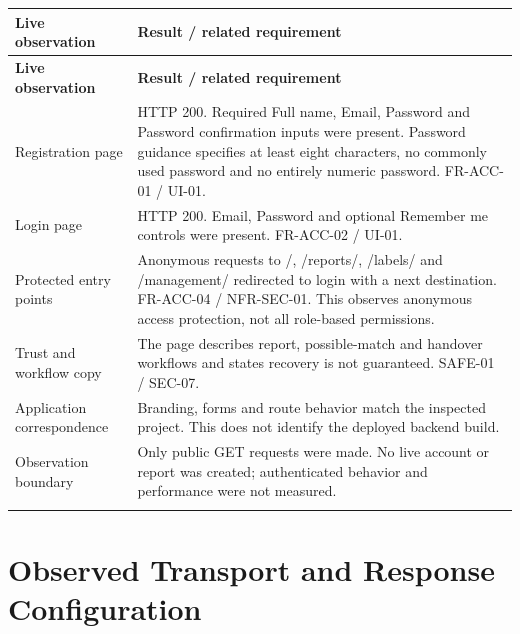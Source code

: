 \documentclass[12pt,a4paper,oneside]{report}
\begin{document}
\begin{longtable}{@{}P{0.27\dimexpr\textwidth-12pt\relax}P{0.73\dimexpr\textwidth-12pt\relax}@{}}

\toprule \textbf{Live observation} & \textbf{Result / related requirement} \\ \midrule\endfirsthead

\toprule \textbf{Live observation} & \textbf{Result / related requirement} \\ \midrule\endhead

\bottomrule\endfoot

Registration page & HTTP 200. Required Full name, Email, Password and Password confirmation inputs were present. Password guidance specifies at least eight characters, no commonly used password and no entirely numeric password. FR-ACC-01 / UI-01. \\ \addlinespace[3pt]

Login page & HTTP 200. Email, Password and optional Remember me controls were present. FR-ACC-02 / UI-01. \\ \addlinespace[3pt]

Protected entry points & Anonymous requests to /, /reports/, /labels/ and /management/ redirected to login with a next destination. FR-ACC-04 / NFR-SEC-01. This observes anonymous access protection, not all role-based permissions. \\ \addlinespace[3pt]

Trust and workflow copy & The page describes report, possible-match and handover workflows and states recovery is not guaranteed. SAFE-01 / SEC-07. \\ \addlinespace[3pt]

Application correspondence & Branding, forms and route behavior match the inspected project. This does not identify the deployed backend build. \\ \addlinespace[3pt]

Observation boundary & Only public GET requests were made. No live account or report was created; authenticated behavior and performance were not measured. \\ \addlinespace[3pt]

\end{longtable}


\section{Observed Transport and Response Configuration}
\end{document}
